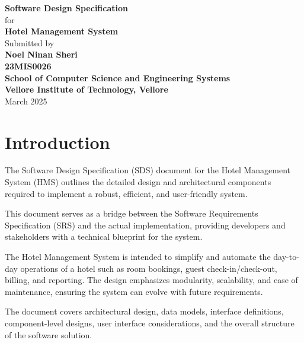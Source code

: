 \documentclass[a4paper,12pt]{article}
\title{}
\author{}
\date{}
\begin{document}
\fontsize{13}{16}\selectfont

\begin{titlepage}
\begin{center}
\vspace*{3cm}
\Huge \textbf{Software Design Specification} \\
\vspace{0.5cm}
\LARGE for \\
\vspace{0.5cm}
\Huge \textbf{Hotel Management System} \\

\vspace{3cm}
\Large
Submitted by \\
\vspace{0.3cm}
\textbf{Noel Ninan Sheri} \\
\textbf{23MIS0026} \\
\textbf{School of Computer Science and Engineering Systems} \\
\textbf{Vellore Institute of Technology, Vellore} \\

\vfill
\Large March 2025
\end{center}
\end{titlepage}

\newpage
\tableofcontents
\newpage

\section{Introduction}

The Software Design Specification (SDS) document for the Hotel Management System (HMS) outlines the detailed design and architectural components required to implement a robust, efficient, and user-friendly system. 

This document serves as a bridge between the Software Requirements Specification (SRS) and the actual implementation, providing developers and stakeholders with a technical blueprint for the system.

The Hotel Management System is intended to simplify and automate the day-to-day operations of a hotel such as room bookings, guest check-in/check-out, billing, and reporting. The design emphasizes modularity, scalability, and ease of maintenance, ensuring the system can evolve with future requirements.

The document covers architectural design, data models, interface definitions, component-level designs, user interface considerations, and the overall structure of the software solution.
\end{document}
